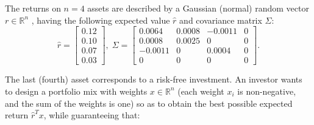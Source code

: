 \rm
\label{exer:portfolio_socp}
The returns on $n = 4$ assets are described by a Gaussian (normal) random vector $r \in \mathbb{R}^n$ , having the following expected value $\hat{r}$ and covariance matrix $\Sigma$: 
\[
\hat{r} = 
\begin{bmatrix}
    0.12  \\
    0.10  \\
    0.07 \\
    0.03 
    
\end{bmatrix}, \; \Sigma = 
\begin{bmatrix}
    0.0064 & 0.0008 & -0.0011  & 0 \\
    0.0008 & 0.0025 & 0  & 0 \\
    -0.0011 & 0 & 0.0004  & 0 \\
    0 & 0 & 0  & 0
    
\end{bmatrix}
.
\]


The last (fourth) asset corresponds to a risk-free investment. An investor
wants to design a portfolio mix with weights $x \in \mathbb{R}^n$ (each weight $x_i$
is non-negative, and the sum of the weights is one) so as to obtain the best possible expected return $\hat{r}^Tx$, while guaranteeing that: \\ 

